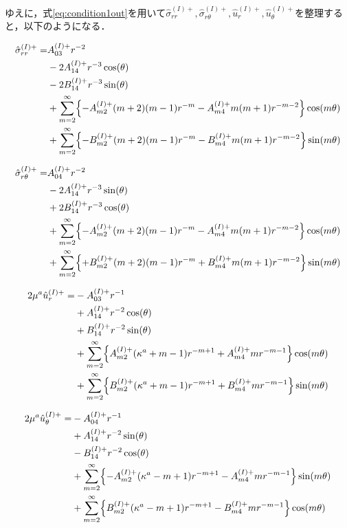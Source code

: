 ゆえに，式\eqref{eq:condition1out}を用いて$\hat{\sigma}_{rr}^{(I)+},\hat{\sigma}_{r\theta}^{(I)+},\hat{u}_{r}^{(I)+},\hat{u}_{\theta}^{(I)+}$を整理すると，以下のようになる．

\begin{align}
\hat{\sigma}_{rr}^{(I)+} =&A_{03}^{(I)+}r^{-2}
\nonumber
\\
&-2A_{14}^{(I)+}r^{-3}\cos(\theta)
\nonumber
\\
&-2B_{14}^{(I)+}r^{-3}\sin(\theta)
\nonumber
\\
&+\sum_{m=2}^{\infty}\Bigl\{
-A_{m2}^{(I)+}(m+2)(m-1)r^{-m}
-A_{m4}^{(I)+}m(m+1)r^{-m-2}\Bigr\}\cos(m\theta)
\nonumber
\\
&+\sum_{m=2}^{\infty}\Bigl\{
-B_{m2}^{(I)+}(m+2)(m-1)r^{-m}
-B_{m4}^{(I)+}m(m+1)r^{-m-2}\Bigr\}\sin(m\theta)
\label{eq:sigmarr1out}
\end{align}

\begin{align}
\hat{\sigma}_{r\theta}^{(I)+} =&A_{04}^{(I)+}r^{-2}
\nonumber
\\
&-2A_{14}^{(I)+}r^{-3}\sin(\theta)
\nonumber
\\
&+2B_{14}^{(I)+}r^{-3}\cos(\theta)
\nonumber
\\
&+\sum_{m=2}^{\infty}\Bigl\{
-A_{m2}^{(I)+}(m+2)(m-1)r^{-m}
-A_{m4}^{(I)+}m(m+1)r^{-m-2}\Bigr\}\cos(m\theta)
\nonumber
\\
&+\sum_{m=2}^{\infty}\Bigl\{
+B_{m2}^{(I)+}(m+2)(m-1)r^{-m}
+B_{m4}^{(I)+}m(m+1)r^{-m-2}\Bigr\}\sin(m\theta)
\label{eq:sigmartheta1out}
\end{align}

\begin{align}
2\mu^{a}\hat{u}_{r}^{(I)+} =&-A_{03}^{(I)+}r^{-1}
\nonumber
\\
&+A_{14}^{(I)+}r^{-2}\cos(\theta)
\nonumber
\\
&+B_{14}^{(I)+}r^{-2}\sin(\theta)
\nonumber
\\
&+\sum_{m=2}^{\infty}\Bigl\{A_{m2}^{(I)+}(\kappa^{a}+m-1)r^{-m+1}
+A_{m4}^{(I)+}mr^{-m-1}\Bigr\}\cos(m\theta)
\nonumber
\\
&+\sum_{m=2}^{\infty}\Bigl\{B_{m2}^{(I)+}(\kappa^{a}+m-1)r^{-m+1}
+B_{m4}^{(I)+}mr^{-m-1}\Bigr\}\sin(m\theta)
\label{eq:ur1out}
\end{align}


\begin{align}
2\mu^{a}\hat{u}_{\theta}^{(I)+} =&-A_{04}^{(I)+}r^{-1}
\nonumber
\\
&+A_{14}^{(I)+}r^{-2}\sin(\theta)
\nonumber
\\
&-B_{14}^{(I)+}r^{-2}\cos(\theta)
\nonumber
\\
&+\sum_{m=2}^{\infty}\Bigl\{-A_{m2}^{(I)+}(\kappa^{a}-m+1)r^{-m+1}
-A_{m4}^{(I)+}mr^{-m-1}\Bigr\}\sin(m\theta)
\nonumber
\\
&+\sum_{m=2}^{\infty}\Bigl\{B_{m2}^{(I)+}(\kappa^{a}-m+1)r^{-m+1}
-B_{m4}^{(I)+}mr^{-m-1}\Bigr\}\cos(m\theta)
\label{eq:utheta1out}
\end{align}

\newpage
